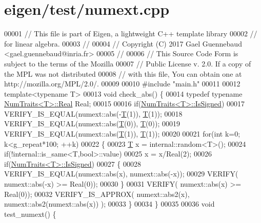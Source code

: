 \hypertarget{eigen_2test_2numext_8cpp_source}{}\section{eigen/test/numext.cpp}
\label{eigen_2test_2numext_8cpp_source}

\begin{DoxyCode}
00001 \textcolor{comment}{// This file is part of Eigen, a lightweight C++ template library}
00002 \textcolor{comment}{// for linear algebra.}
00003 \textcolor{comment}{//}
00004 \textcolor{comment}{// Copyright (C) 2017 Gael Guennebaud <gael.guennebaud@inria.fr>}
00005 \textcolor{comment}{//}
00006 \textcolor{comment}{// This Source Code Form is subject to the terms of the Mozilla}
00007 \textcolor{comment}{// Public License v. 2.0. If a copy of the MPL was not distributed}
00008 \textcolor{comment}{// with this file, You can obtain one at http://mozilla.org/MPL/2.0/.}
00009 
00010 \textcolor{preprocessor}{#include "main.h"}
00011 
00012 \textcolor{keyword}{template}<\textcolor{keyword}{typename} T>
00013 \textcolor{keywordtype}{void} check\_abs() \{
00014   \textcolor{keyword}{typedef} \textcolor{keyword}{typename} \hyperlink{group___core___module_struct_eigen_1_1_num_traits}{NumTraits<T>::Real} Real;
00015 
00016   \textcolor{keywordflow}{if}(\hyperlink{group___core___module_struct_eigen_1_1_num_traits}{NumTraits<T>::IsSigned})
00017     VERIFY\_IS\_EQUAL(numext::abs(-\hyperlink{group___sparse_core___module}{T}(1)), \hyperlink{group___sparse_core___module}{T}(1));
00018   VERIFY\_IS\_EQUAL(numext::abs(\hyperlink{group___sparse_core___module}{T}(0)), \hyperlink{group___sparse_core___module}{T}(0));
00019   VERIFY\_IS\_EQUAL(numext::abs(\hyperlink{group___sparse_core___module}{T}(1)), \hyperlink{group___sparse_core___module}{T}(1));
00020 
00021   \textcolor{keywordflow}{for}(\textcolor{keywordtype}{int} k=0; k<g\_repeat*100; ++k)
00022   \{
00023     \hyperlink{group___sparse_core___module}{T} x = internal::random<T>();
00024     \textcolor{keywordflow}{if}(!internal::is\_same<T,bool>::value)
00025       x = x/Real(2);
00026     \textcolor{keywordflow}{if}(\hyperlink{group___core___module_struct_eigen_1_1_num_traits}{NumTraits<T>::IsSigned})
00027     \{
00028       VERIFY\_IS\_EQUAL(numext::abs(x), numext::abs(-x));
00029       VERIFY( numext::abs(-x) >= Real(0));
00030     \}
00031     VERIFY( numext::abs(x) >= Real(0));
00032     VERIFY\_IS\_APPROX( numext::abs2(x), numext::abs2(numext::abs(x)) );
00033   \}
00034 \}
00035 
00036 \textcolor{keywordtype}{void} test\_numext() \{

\end{DoxyCode}
